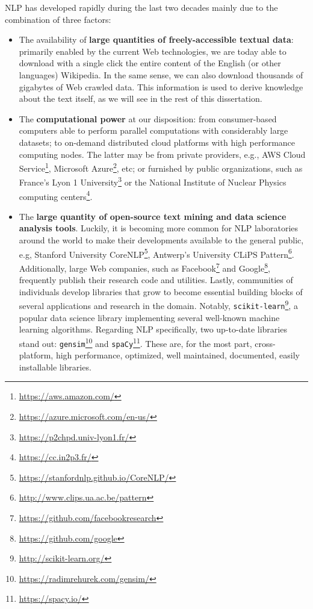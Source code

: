 NLP has developed rapidly \cite{ClarkBook2010} during the last two decades mainly due to the combination of three factors: 
\begin{itemize}
\item The  availability of \textbf{large quantities of freely-accessible textual data}: primarily enabled by the current Web technologies, we are today able to download with a single click the entire content of the English (or other languages) Wikipedia. In the same sense, we can also download thousands of gigabytes of Web crawled data. This information is used to derive knowledge about the text itself, as we will see in the rest of this dissertation. 
\item The \textbf{computational power} at our disposition: from consumer-based computers able to perform parallel computations with considerably large datasets; to on-demand distributed cloud platforms with high performance computing nodes. The latter may be from private providers, e.g., AWS Cloud Service\footnote{\url{https://aws.amazon.com/}}, Microsoft Azure\footnote{\url{https://azure.microsoft.com/en-us/}}, etc; or furnished by public organizations, such as France's Lyon 1 University\footnote{\url{https://p2chpd.univ-lyon1.fr/}} or the National Institute of Nuclear Physics computing centers\footnote{\url{https://cc.in2p3.fr/}}.

\item  The \textbf{large quantity of open-source text mining and data science analysis tools}. Luckily, it is becoming more common for NLP laboratories around the world to make their developments available to the general public, e.g, Stanford University CoreNLP\footnote{\url{https://stanfordnlp.github.io/CoreNLP/}}, Antwerp's University CLiPS Pattern\footnote{\url{http://www.clips.ua.ac.be/pattern}}.
Additionally, large Web companies, such as Facebook\footnote{\url{https://github.com/facebookresearch}} and Google\footnote{\url{https://github.com/google}}, frequently publish their research code and utilities. Lastly, communities of individuals develop libraries that grow to become essential building blocks of several applications and research in the domain. Notably, \texttt{scikit-learn}\footnote{\url{http://scikit-learn.org/}}, a popular data science library implementing several well-known machine learning algorithms. Regarding NLP specifically, two up-to-date libraries stand out:  \texttt{gensim}\footnote{\url{https://radimrehurek.com/gensim/}} and \texttt{spaCy}\footnote{\url{https://spacy.io/}}. These are, for the most part, cross-platform, high performance, optimized, well maintained, documented, easily installable libraries.

\end{itemize} 
